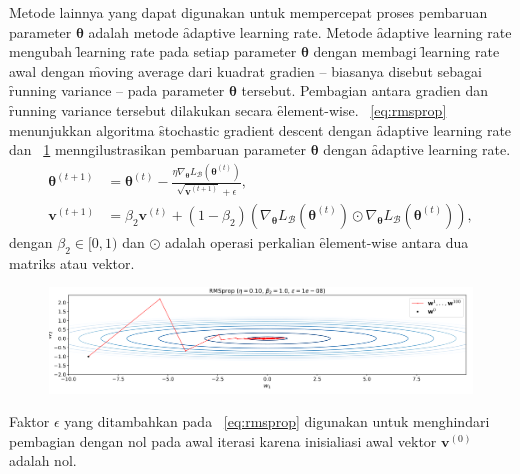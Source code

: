 Metode lainnya yang dapat digunakan untuk mempercepat proses pembaruan parameter $\bm{\theta}$ adalah metode \f{adaptive learning rate}. Metode \f{adaptive learning rate} mengubah \f{learning rate} pada setiap parameter $\bm{\theta}$ dengan membagi \f{learning rate} awal dengan \f{moving average} dari kuadrat gradien -- biasanya disebut sebagai \f{running variance} -- pada parameter $\bm{\theta}$ tersebut. Pembagian antara gradien dan \f{running variance} tersebut dilakukan secara \f{element-wise}. \equ~\ref{eq:rmsprop} menunjukkan algoritma \f{stochastic gradient descent} dengan \f{adaptive learning rate} dan \pic~\ref{fig:rmsprop} menngilustrasikan pembaruan parameter $\bm{\theta}$ dengan \f{adaptive learning rate}.
\begin{align}
    \label{eq:rmsprop}
    \bm{\theta}^{(t+1)} &= \bm{\theta}^{(t)} - \frac{\eta \nabla_{\bm{\theta}} L_{\mathcal{B}}(\bm{\theta}^{(t)})}{\sqrt{\mathbf{v}^{(t+1)}} + \epsilon}, \\
    \mathbf{v}^{(t+1)} &= \beta_2 \mathbf{v}^{(t)} + (1 - \beta_2) \left(\nabla_{\bm{\theta}} L_{\mathcal{B}}(\bm{\theta}^{(t)})\odot \nabla_{\bm{\theta}} L_{\mathcal{B}}(\bm{\theta}^{(t)})\right),
\end{align}
dengan $\beta_2 \in [0, 1)$ dan $\odot$ adalah operasi perkalian \f{element-wise} antara dua matriks atau vektor.
\begin{figure}
    \centering
    \includegraphics[width=1\textwidth]{assets/pics/RMSPROP.png}
    \label{fig:rmsprop}
\end{figure}

Faktor $\epsilon$ yang ditambahkan pada \equ~\ref{eq:rmsprop} digunakan untuk menghindari pembagian dengan nol pada awal iterasi karena inisialiasi awal vektor $\mathbf{v}^{(0)}$ adalah nol.


